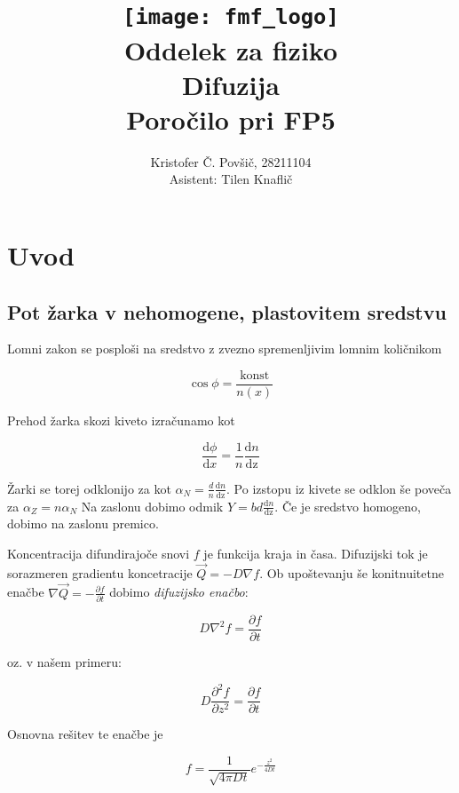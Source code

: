 \documentclass[11pt]{article}
\title{
  \texttt{[image: fmf\_logo]}\\
  {\small Oddelek za fiziko} \\
  {Difuzija}\\
  {\small Poročilo pri FP5}\\

}
\date{}
\author{ Kristofer Č. Povšič, 28211104 \\[5 cm]
 \small  Asistent: Tilen Knaflič \\
}
\begin{document}
\maketitle
\newpage
\tableofcontents

\section{Uvod}\label{sec:org7496756}
\subsection{Pot žarka v nehomogene, plastovitem sredstvu}\label{sec:org81f2c64}
Lomni zakon se posploši na sredstvo z zvezno spremenljivim lomnim količnikom

\[ \cos \phi = \frac{\text{konst}}{n(x)}
\]

Prehod žarka skozi kiveto izračunamo kot

\begin{equation}
\label{eq:1}
\frac{\mathrm{d} \phi}{\mathrm{d} x} = \frac{1}{n} \frac{\mathrm{d} n}{\mathrm{dz} }
\end{equation}

Žarki se torej odklonijo za kot \(\alpha_N = \frac{d}{n} \frac{\mathrm{d} n}{\mathrm{dz}}\). Po izstopu iz kivete se odklon še poveča za \(\alpha_Z = n \alpha_N\) Na zaslonu dobimo odmik \(Y = bd \frac{\mathrm{d} n}{\mathrm{dz}}\). Če je sredstvo homogeno, dobimo na zaslonu premico.

Koncentracija difundirajoče snovi \(f\) je funkcija kraja in časa. Difuzijski tok je sorazmeren gradientu koncetracije \(\vec{Q} = - D \nabla f\). Ob upoštevanju še konitnuitetne enačbe \(\nabla \vec{Q} = -\frac{\partial f}{\partial t}\) dobimo \emph{difuzijsko enačbo}:

\begin{equation}
\label{eq:2}
D \nabla ^2 f = \frac{\partial f}{\partial t}
\end{equation}

oz. v našem primeru:

\begin{equation}
\label{eq:3}
D \frac{\partial ^2 f}{\partial z ^2} = \frac{\partial f}{\partial t}
\end{equation}

Osnovna rešitev te enačbe je

\begin{equation}
\label{eq:4}
f = \frac{1}{\sqrt{4 \pi Dt}} e^{- \frac{z ^2}{4Dt}}
\end{equation}
\end{document}
